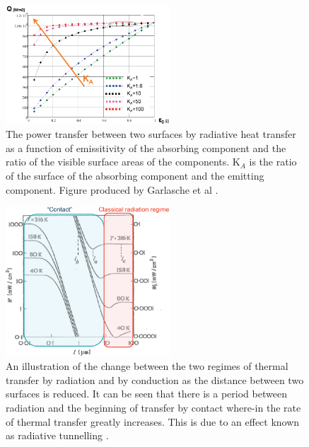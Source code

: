 \begin{figure}
\begin{center}
\includegraphics[width=0.55\textwidth]{appendices/figures/powTransRadSurEmis.png}
\end{center}
\caption{The power transfer between two surfaces by radiative heat transfer as a function of emissitivity of the absorbing component and the ratio of the visible surface areas of the components. K$_{A}$ is the ratio of the surface of the absorbing component and the emitting component. Figure produced by Garlasche et al \cite{Garlasche:heatTransfer}.}
\label{fig:powTransRadSurfEmis}
\end{figure}

\begin{figure}
\begin{center}
\includegraphics[width=0.55\textwidth]{appendices/figures/irTunnelling.png}
\end{center}
\caption{An illustration of the change between the two regimes of thermal transfer by radiation and by conduction as the distance between two surfaces is reduced. It can be seen that there is a period between radiation and the beginning of transfer by contact where-in the rate of thermal transfer greatly increases. This is due to an effect known as radiative tunnelling \cite{Hargreaves:IRTunnel}.}
\label{fig:irTun}
\end{figure}
